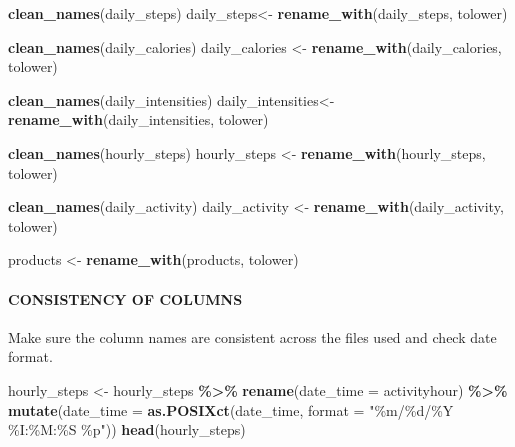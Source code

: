 \documentclass[
]{article}
\newenvironment{Shaded}{\begin{snugshade}}{\end{snugshade}}
\newcommand{\AttributeTok}[1]{\textcolor[rgb]{0.13,0.29,0.53}{#1}}
\newcommand{\FunctionTok}[1]{\textcolor[rgb]{0.13,0.29,0.53}{\textbf{#1}}}
\newcommand{\NormalTok}[1]{#1}
\newcommand{\OtherTok}[1]{\textcolor[rgb]{0.56,0.35,0.01}{#1}}
\newcommand{\SpecialCharTok}[1]{\textcolor[rgb]{0.81,0.36,0.00}{\textbf{#1}}}
\newcommand{\StringTok}[1]{\textcolor[rgb]{0.31,0.60,0.02}{#1}}
\begin{document}
\begin{Shaded}
\begin{Highlighting}[]
\FunctionTok{clean\_names}\NormalTok{(daily\_steps)}
\NormalTok{daily\_steps}\OtherTok{\textless{}{-}} \FunctionTok{rename\_with}\NormalTok{(daily\_steps, tolower)}

\FunctionTok{clean\_names}\NormalTok{(daily\_calories)}
\NormalTok{daily\_calories }\OtherTok{\textless{}{-}} \FunctionTok{rename\_with}\NormalTok{(daily\_calories, tolower)}

\FunctionTok{clean\_names}\NormalTok{(daily\_intensities)}
\NormalTok{daily\_intensities}\OtherTok{\textless{}{-}} \FunctionTok{rename\_with}\NormalTok{(daily\_intensities, tolower)}

\FunctionTok{clean\_names}\NormalTok{(hourly\_steps)}
\NormalTok{hourly\_steps }\OtherTok{\textless{}{-}} \FunctionTok{rename\_with}\NormalTok{(hourly\_steps, tolower)}

\FunctionTok{clean\_names}\NormalTok{(daily\_activity)}
\NormalTok{daily\_activity }\OtherTok{\textless{}{-}} \FunctionTok{rename\_with}\NormalTok{(daily\_activity, tolower)}

\NormalTok{products }\OtherTok{\textless{}{-}} \FunctionTok{rename\_with}\NormalTok{(products, tolower)}
\end{Highlighting}
\end{Shaded}

\hypertarget{consistency-of-columns}{%
\paragraph{CONSISTENCY OF COLUMNS}\label{consistency-of-columns}}

Make sure the column names are consistent across the files used and
check date format.

\begin{Shaded}
\begin{Highlighting}[]
\NormalTok{hourly\_steps }\OtherTok{\textless{}{-}}\NormalTok{ hourly\_steps }\SpecialCharTok{\%\textgreater{}\%}
  \FunctionTok{rename}\NormalTok{(}\AttributeTok{date\_time =}\NormalTok{ activityhour) }\SpecialCharTok{\%\textgreater{}\%}
  \FunctionTok{mutate}\NormalTok{(}\AttributeTok{date\_time =} \FunctionTok{as.POSIXct}\NormalTok{(date\_time, }\AttributeTok{format =} \StringTok{"\%m/\%d/\%Y \%I:\%M:\%S \%p"}\NormalTok{))}
\FunctionTok{head}\NormalTok{(hourly\_steps)}
\end{Highlighting}
\end{Shaded}
\end{document}
